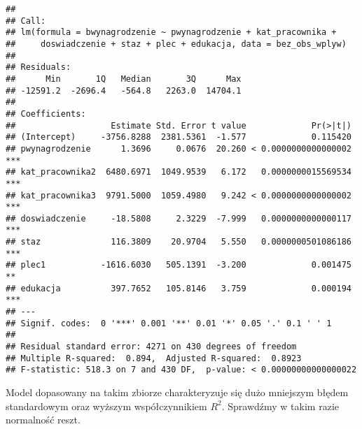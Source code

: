 \documentclass[]{book}
\newenvironment{Shaded}{\begin{snugshade}}{\end{snugshade}}
\newcommand{\KeywordTok}[1]{\textcolor[rgb]{0.13,0.29,0.53}{\textbf{#1}}}
\newcommand{\DataTypeTok}[1]{\textcolor[rgb]{0.13,0.29,0.53}{#1}}
\newcommand{\StringTok}[1]{\textcolor[rgb]{0.31,0.60,0.02}{#1}}
\newcommand{\OperatorTok}[1]{\textcolor[rgb]{0.81,0.36,0.00}{\textbf{#1}}}
\newcommand{\NormalTok}[1]{#1}
\begin{document}
\begin{Shaded}
\end{Shaded}

\begin{verbatim}
## 
## Call:
## lm(formula = bwynagrodzenie ~ pwynagrodzenie + kat_pracownika + 
##     doswiadczenie + staz + plec + edukacja, data = bez_obs_wplyw)
## 
## Residuals:
##      Min       1Q   Median       3Q      Max 
## -12591.2  -2696.4   -564.8   2263.0  14704.1 
## 
## Coefficients:
##                   Estimate Std. Error t value             Pr(>|t|)    
## (Intercept)     -3756.8288  2381.5361  -1.577             0.115420    
## pwynagrodzenie      1.3696     0.0676  20.260 < 0.0000000000000002 ***
## kat_pracownika2  6480.6971  1049.9539   6.172   0.0000000015569534 ***
## kat_pracownika3  9791.5000  1059.4980   9.242 < 0.0000000000000002 ***
## doswiadczenie     -18.5808     2.3229  -7.999   0.0000000000000117 ***
## staz              116.3809    20.9704   5.550   0.0000000501086186 ***
## plec1           -1616.6030   505.1391  -3.200             0.001475 ** 
## edukacja          397.7652   105.8146   3.759             0.000194 ***
## ---
## Signif. codes:  0 '***' 0.001 '**' 0.01 '*' 0.05 '.' 0.1 ' ' 1
## 
## Residual standard error: 4271 on 430 degrees of freedom
## Multiple R-squared:  0.894,  Adjusted R-squared:  0.8923 
## F-statistic: 518.3 on 7 and 430 DF,  p-value: < 0.00000000000000022
\end{verbatim}

Model dopasowany na takim zbiorze charakteryzuje się dużo mniejszym
błędem standardowym oraz wyższym współczynnikiem \(R^2\). Sprawdźmy w
takim razie normalność reszt.
\end{document}
